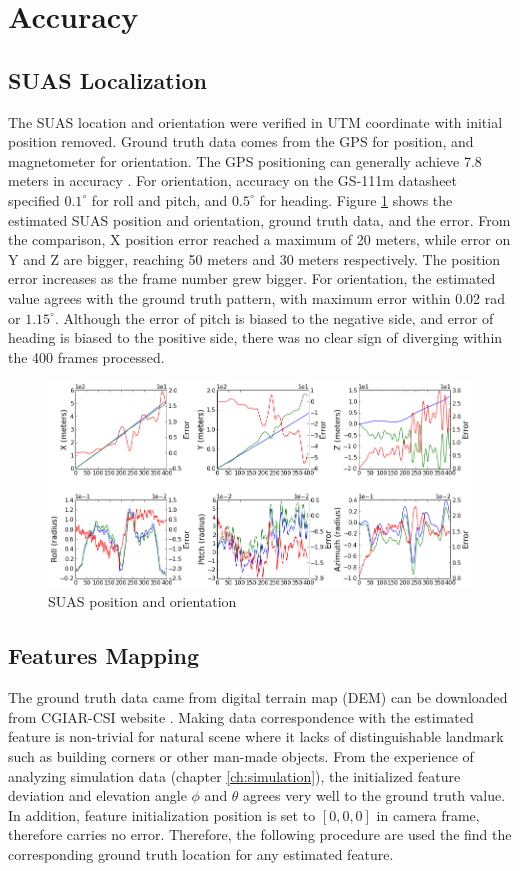 \section{Accuracy}
\subsection{SUAS Localization}

The SUAS location and orientation were verified in UTM coordinate with
initial position removed. Ground truth data comes from the GPS for
position, and magnetometer for orientation. The GPS positioning can
generally achieve 7.8 meters in accuracy \cite{_gps_????}. For
orientation, accuracy on the GS-111m datasheet specified $0.1^{\circ}$
for roll and pitch, and $0.5^{\circ}$ for heading. Figure
\ref{fltfig:6} shows the estimated SUAS position and orientation,
ground truth data, and the error. From the comparison, X position
error reached a maximum of 20 meters, while error on Y and Z are
bigger, reaching 50 meters and 30 meters respectively. The position
error increases as the frame number grew bigger. For orientation, the
estimated value agrees with the ground truth pattern, with maximum
error within 0.02 rad or $1.15^{\circ}$. Although the error of pitch
is biased to the negative side, and error of heading is biased to the
positive side, there was no clear sign of diverging within the 400
frames processed.

\begin{figure}[h]
\centering
\includegraphics[width=12cm, keepaspectratio=true]
{./Figures/fltfig/cut1/Figure30.png}
\caption{SUAS position and orientation}
\label{fltfig:6}
\end{figure}
\FloatBarrier
\subsection{Features Mapping}\label{sec:accuracy_features}

The ground truth data came from digital terrain map (DEM) can be
downloaded from CGIAR-CSI website \cite{_cgiar-csi_????}. Making data
correspondence with the estimated feature is non-trivial for natural
scene where it lacks of distinguishable landmark such as building corners or
other man-made objects. From the experience of analyzing simulation
data (chapter \ref{ch:simulation}), the initialized feature deviation
and elevation angle $\phi$ and $\theta$ agrees very well to the ground
truth value. In addition, feature initialization position is set to
$[0, 0, 0]$ in camera frame, therefore carries no error. Therefore, the
following procedure are used the find the corresponding ground truth
location for any estimated feature.

